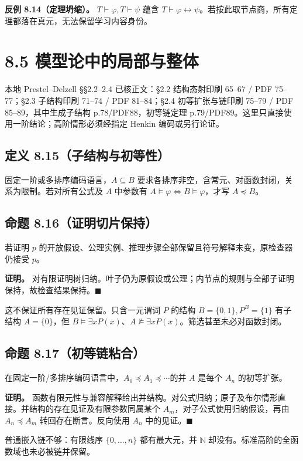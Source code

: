 \documentclass[UTF8,a4paper,zihao=-4,fontset=windows,openany]{ctexbook}
\begin{document}
\textbf{反例 8.14（定理坍缩）。} \(T\vdash\varphi,T\vdash\psi\) 蕴含 \(T\vdash\varphi\leftrightarrow\psi\)。若按此取节点商，所有定理都落在真元，无法保留学习内容身份。

\section{8.5 模型论中的局部与整体}
本地 Prestel–Delzell §§2.2–2.4 已核正文：§2.2 结构态射印刷 65–67 / PDF 75–77；§2.3 子结构印刷 71–74 / PDF 81–84；§2.4 初等扩张与链印刷 75–79 / PDF 85–89，其中生成子结构 p.78/PDF88，初等链定理 p.79/PDF89。这里只直接使用一阶结论；高阶情形必须经指定 Henkin 编码或另行论证。

\subsection{定义 8.15（子结构与初等性）}
固定一阶或多排序编码语言，\(A\subseteq B\) 要求各排序非空，含常元、对函数封闭，关系为限制。若对所有公式及 \(A\) 中参数有 \(A\models\varphi\iff B\models\varphi\)，才写 \(A\preccurlyeq B\)。

\subsection{命题 8.16（证明切片保持）}
若证明 \(p\) 的开放假设、公理实例、推理步骤全部保留且符号解释未变，原检查器仍接受 \(p\)。

\textbf{证明。} 对有限证明树归纳。叶子仍为原假设或公理；内节点的规则与全部子证明保持，故检查结果保持。\(\blacksquare\)

这不保证所有存在见证保留。只含一元谓词 \(P\) 的结构 \(B=\{0,1\},P^B=\{1\}\) 有子结构 \(A=\{0\}\)，但 \(B\models\exists xP(x)\)、\(A\not\models\exists xP(x)\)。筛选甚至未必对函数封闭。

\subsection{命题 8.17（初等链粘合）}
在固定一阶/多排序编码语言中，\(A_0\preccurlyeq A_1\preccurlyeq\cdots\)的并 \(A\) 是每个 \(A_n\) 的初等扩张。

\textbf{证明。} 函数有限元性与兼容解释给出并结构。对公式归纳；原子及布尔情形直接。并结构的存在见证及有限参数同属某个 \(A_m\)，对子公式使用归纳假设，再由 \(A_n\preccurlyeq A_m\) 转回存在断言。反向使用 \(A_n\) 中的见证。\(\blacksquare\)

普通嵌入链不够：有限线序 \(\{0,\ldots,n\}\) 都有最大元，并 \(\mathbb N\) 却没有。标准高阶的全函数域也未必被链并保留。
\end{document}

